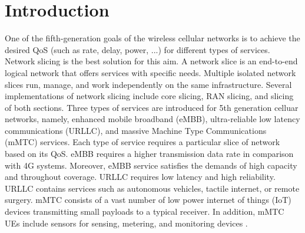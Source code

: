 \documentclass[conference]{IEEEtran}
\begin{document}
\section{Introduction} 
One of the fifth-generation goals of the wireless cellular networks  is to achieve the desired QoS (such as rate, delay, power, ...) for different types of services. Network slicing is the best solution for this aim. A network slice is an end-to-end logical network that offers services with specific needs.  
Multiple isolated network slices run, manage, and work independently on the same infrastructure. 
Several implementations of network slicing include core slicing, RAN slicing, and slicing of both sections. 
Three types of services are introduced for 5th generation celluar networks, namely, enhanced mobile broadband (eMBB), ultra-reliable low latency communications (URLLC), and massive Machine Type Communications (mMTC) services. Each type of service requires a particular slice of network based on its QoS.
eMBB requires a higher transmission data rate in comparison with 4G systems. Moreover, eMBB service satisfies the demands of high capacity and throughout coverage.
URLLC requires low latency  and high reliability. URLLC contains services such as autonomous vehicles, tactile internet, or remote surgery.
mMTC consists of a vast number of low power internet of things (IoT) devices transmitting small payloads to a typical receiver. In addition, mMTC UEs include sensors for sensing, metering, and monitoring devices 
\cite{shen2020ai,setayesh2020joint,popovski20185g,dogra2020survey,kassab2018coexistence,alsenwi2021intelligent}.
\end{document}
